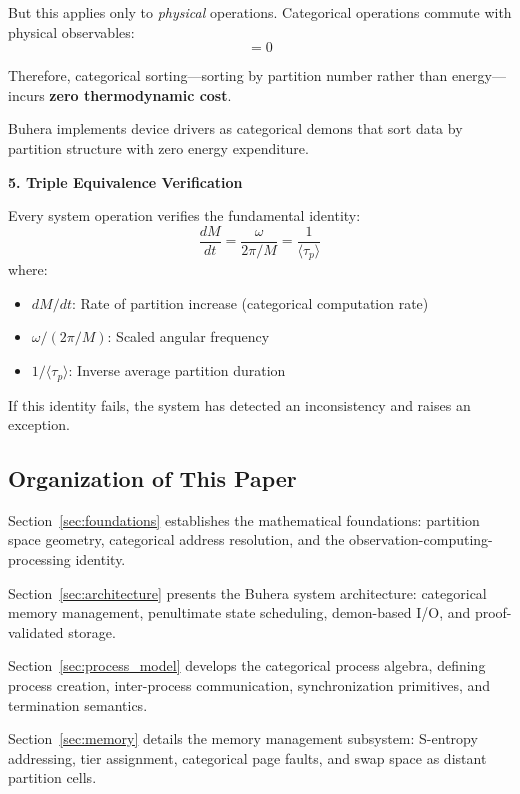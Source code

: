 \documentclass[twocolumn,10pt]{article}
\theoremstyle{definition}
\theoremstyle{remark}
\begin{document}
But this applies only to \emph{physical} operations. Categorical operations commute with physical observables:
\begin{equation}
    [\hat{O}_{\text{cat}}, \hat{O}_{\text{phys}}] = 0
\end{equation}

Therefore, categorical sorting—sorting by partition number rather than energy—incurs \textbf{zero thermodynamic cost}.

Buhera implements device drivers as categorical demons that sort data by partition structure with zero energy expenditure.

\textbf{5. Triple Equivalence Verification}

Every system operation verifies the fundamental identity:
\begin{equation}
    \frac{dM}{dt} = \frac{\omega}{2\pi/M} = \frac{1}{\langle \tau_p \rangle}
\end{equation}
where:
\begin{itemize}
    \item $dM/dt$: Rate of partition increase (categorical computation rate)
    \item $\omega/(2\pi/M)$: Scaled angular frequency
    \item $1/\langle \tau_p \rangle$: Inverse average partition duration
\end{itemize}

If this identity fails, the system has detected an inconsistency and raises an exception.

\subsection{Organization of This Paper}

Section~\ref{sec:foundations} establishes the mathematical foundations: partition space geometry, categorical address resolution, and the observation-computing-processing identity.

Section~\ref{sec:architecture} presents the Buhera system architecture: categorical memory management, penultimate state scheduling, demon-based I/O, and proof-validated storage.

Section~\ref{sec:process_model} develops the categorical process algebra, defining process creation, inter-process communication, synchronization primitives, and termination semantics.

Section~\ref{sec:memory} details the memory management subsystem: S-entropy addressing, tier assignment, categorical page faults, and swap space as distant partition cells.
\end{document}

